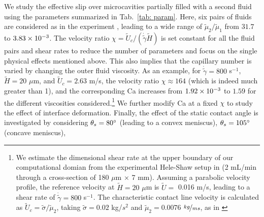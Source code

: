 We study the effective slip over microcavities partially filled with a second fluid using the parameters summarized in Tab.\ \ref{tab: param}.
Here, six pairs of fluids are considered as in the experiment \cite{Solomon}, leading to a wide range of $\tilde{\mu}_2/\tilde{\mu}_1$ from $31.7$ to $3.83\times 10^{-3}$.  The velocity ratio $\chi=\tilde{U}_c/ (\dot{\tilde{\gamma}} \tilde{H})$ is set constant for all the fluid pairs and shear rates to reduce the number of parameters and focus on the single physical effects mentioned above. This also implies that the capillary number is varied by changing the outer fluid viscosity. As an example, for $\dot{\tilde{\gamma}}=800$ s$^{-1}$, $\tilde{H}=20$ $\mu$m, and $\tilde{U}_c=2.63$ m/s, 
the velocity ratio $\chi \approx 164$ (which is indeed much greater than 1), and the corresponding Ca increases from $1.92\times 10^{-3}$ to $1.59$ for the different viscosities considered.\footnote{We estimate the dimensional shear rate at the upper boundary of our computational domian from the experimental Hele-Shaw setup in \cite{Wexler} (2 mL/min through a cross-section of 180 $\mu$m $\times$ 7 mm). Assuming a parabolic velocity profile, the reference velocity at $\tilde{H}=20$ $\mu$m is $\tilde{U}=$ 0.016 m/s, leading to a shear rate of $\dot{\tilde{\gamma}}=800$ s$^{-1}$. The characteristic contact line velocity is calculated as $\tilde{U}_c=\tilde{\sigma}/\tilde{\mu}_2$, taking $\tilde{\sigma}=0.02$ kg/$s^2$ and $\tilde{\mu}_2=0.0076$ $\nicefrac{kg}{ms}$, as in \cite{Martin}} We further modify Ca at a fixed $\chi$ to study the effect of interface deformation. Finally, the effect of the static contact angle is investigated by considering $\theta_s=80\degree$ (leading to a convex meniscus), $\theta_s=105\degree$ (concave meniscus), 

